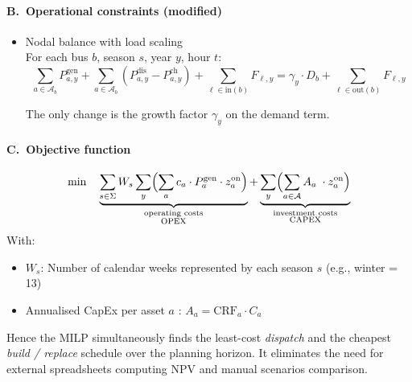 \paragraph{B.~Operational constraints (modified)}
\begin{itemize}

      
      \item Nodal balance with load scaling\\
            For each bus $b$, season $s$, year $y$, hour $t$:
            \begin{equation}
                  \sum_{a \in \mathcal{A}_b} P^{\text{gen}}_{a,y} +
                  \sum_{a \in \mathcal{A}_b} (P^{\text{dis}}_{a,y} - P^{\text{ch}}_{a,y}) +
                  \sum_{\ell \in \text{in}(b)} F_{\ell,y}
                  = 
                  \gamma_y \cdot D_{b} +
                  \sum_{\ell \in \text{out}(b)} F_{\ell,y}
                  \label{eq:nodal_new}
            \end{equation}
      
      The only change is the growth factor $\gamma_y$ on the demand term.
\end{itemize}

\paragraph{C.~Objective function}
\begin{equation}
      \min \quad
      \underbrace{\sum_{s \in \Sigma} W_s \sum_{y}\Bigl(\sum_{a} c_a \cdot P^{\text{gen}}_{a}\cdot z^{\text{on}}_{a}\Bigr )}_{\substack{\text{operating costs} \\ \text{OPEX}}}
      +
      \underbrace{\sum_{y}\Bigl(
      \sum_{a\in\mathcal{A}}
          A_a \;\cdot z^{\text{on}}_{a}\Bigr)}_{\substack{\text{investment costs} \\ \text{CAPEX}}}
  \end{equation}
  With:
  \begin{itemize}
      \item $W_s$: Number of calendar weeks represented by each season $s$ (e.g., winter = 13)
      \item Annualised CapEx per asset $a$ : $A_a = \mathrm{CRF}_a \cdot C_a$ 
  \end{itemize}  
Hence the MILP simultaneously finds the least-cost \emph{dispatch} and the cheapest \emph{build / replace} schedule over the planning horizon. It eliminates the need for external spreadsheets computing NPV and manual scenarios comparison.

